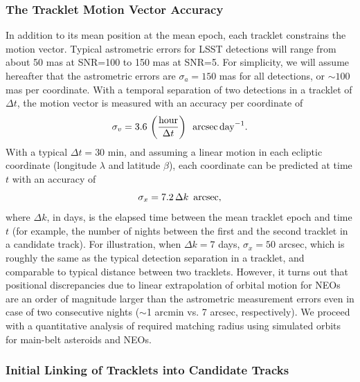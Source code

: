 \subsubsection{The Tracklet Motion Vector Accuracy \label{sec:astromerrors}} 
 
In addition to its mean position at the mean epoch, each tracklet constrains the motion vector. 
Typical astrometric errors for LSST detections will range from about 50 mas at SNR=100 to 
150 mas at SNR=5. For simplicity, we will assume hereafter that the astrometric errors are 
$\sigma_a=150$ mas for all detections, or $\sim 100$ mas per coordinate. With a temporal 
separation of two detections in a tracklet of $\Delta t$, the motion vector is measured with an 
accuracy per coordinate of 
\begin{equation}
\label{eq:sigv}
          \sigma_v = 3.6 \, \left({\rm hour} \over \Delta t\right) \,\,\, {\rm arcsec} \, {\rm day}^{-1}.
\end{equation}
With a typical $\Delta t = 30$ min, and assuming a linear motion in each ecliptic coordinate (longitude
$\lambda$ and latitude $\beta$), each coordinate can be predicted at time $t$ with an accuracy of  
\begin{equation}
            \sigma_x = 7.2 \, \Delta k \,\,\, {\rm arcsec},
\end{equation}
where $\Delta k$, in days, is the elapsed time between the mean tracklet epoch and time $t$
(for example, the number of nights between the first and the second tracklet in a candidate track). 
For illustration, when $\Delta k = 7$ days, $\sigma_x = 50$ arcsec, which is roughly the same 
as the typical detection separation in a tracklet, and comparable to typical distance between
two tracklets.  However, it turns out that positional discrepancies due to linear extrapolation of 
orbital motion for NEOs are an order of magnitude larger than the astrometric measurement errors
even in case of two consecutive nights ($\sim$1 arcmin vs. 7 arcsec, respectively). We proceed with 
a quantitative analysis of required matching radius using simulated orbits for main-belt asteroids
and NEOs. 



\subsubsection{Initial Linking of Tracklets into Candidate Tracks} 

